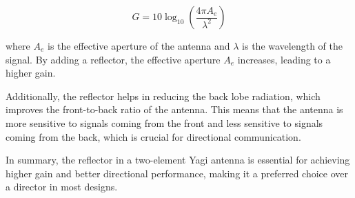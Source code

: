 \[
G = 10 \log_{10} \left( \frac{4 \pi A_e}{\lambda^2} \right)
\]

where \( A_e \) is the effective aperture of the antenna and \( \lambda \) is the wavelength of the signal. By adding a reflector, the effective aperture \( A_e \) increases, leading to a higher gain.

Additionally, the reflector helps in reducing the back lobe radiation, which improves the front-to-back ratio of the antenna. This means that the antenna is more sensitive to signals coming from the front and less sensitive to signals coming from the back, which is crucial for directional communication.

In summary, the reflector in a two-element Yagi antenna is essential for achieving higher gain and better directional performance, making it a preferred choice over a director in most designs.

